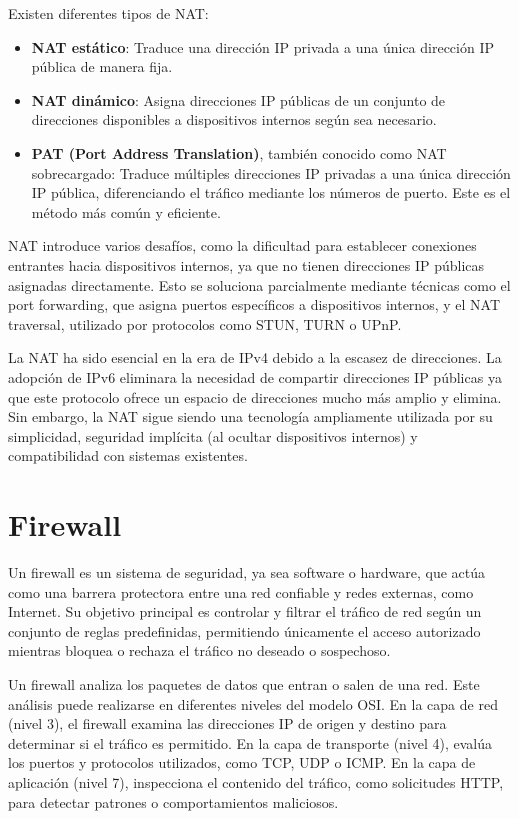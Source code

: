 Existen diferentes tipos de NAT:

\begin{itemize}
    \item \textbf{NAT estático}: Traduce una dirección IP privada a una única dirección IP pública de manera fija.
    \item \textbf{NAT dinámico}: Asigna direcciones IP públicas de un conjunto de direcciones disponibles a dispositivos internos según sea necesario.
    \item \textbf{PAT (Port Address Translation)}, también conocido como NAT sobrecargado: Traduce múltiples direcciones IP privadas a una única dirección IP pública, diferenciando el tráfico mediante los números de puerto. Este es el método más común y eficiente.
\end{itemize}

NAT introduce varios desafíos, como la dificultad para establecer conexiones entrantes hacia dispositivos internos, ya que no tienen direcciones IP públicas asignadas directamente. Esto se soluciona parcialmente mediante técnicas como el port forwarding, que asigna puertos específicos a dispositivos internos, y el NAT traversal, utilizado por protocolos como STUN, TURN o UPnP.

La NAT ha sido esencial en la era de IPv4 debido a la escasez de direcciones. La adopción de IPv6 eliminara la necesidad de compartir direcciones IP públicas ya que este protocolo ofrece un espacio de direcciones mucho más amplio y elimina. Sin embargo, la NAT sigue siendo una tecnología ampliamente utilizada por su simplicidad, seguridad implícita (al ocultar dispositivos internos) y compatibilidad con sistemas existentes.

\section{Firewall}
Un firewall es un sistema de seguridad, ya sea software o hardware, que actúa como una barrera protectora entre una red confiable y redes externas, como Internet. Su objetivo principal es controlar y filtrar el tráfico de red según un conjunto de reglas predefinidas, permitiendo únicamente el acceso autorizado mientras bloquea o rechaza el tráfico no deseado o sospechoso.

Un firewall analiza los paquetes de datos que entran o salen de una red. Este análisis puede realizarse en diferentes niveles del modelo OSI. En la capa de red (nivel 3), el firewall examina las direcciones IP de origen y destino para determinar si el tráfico es permitido. En la capa de transporte (nivel 4), evalúa los puertos y protocolos utilizados, como TCP, UDP o ICMP. En la capa de aplicación (nivel 7), inspecciona el contenido del tráfico, como solicitudes HTTP, para detectar patrones o comportamientos maliciosos.

